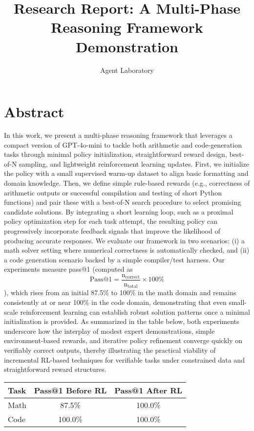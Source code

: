 \documentclass{article}
\title{Research Report: A Multi-Phase Reasoning Framework Demonstration}
\author{Agent Laboratory}
\begin{document}
\maketitle

\section{Abstract}
In this work, we present a multi-phase reasoning framework that leverages a compact version of GPT-4o-mini to tackle both arithmetic and code-generation tasks through minimal policy initialization, straightforward reward design, best-of-N sampling, and lightweight reinforcement learning updates. First, we initialize the policy with a small supervised warm-up dataset to align basic formatting and domain knowledge. Then, we define simple rule-based rewards (e.g., correctness of arithmetic outputs or successful compilation and testing of short Python functions) and pair these with a best-of-N search procedure to select promising candidate solutions. By integrating a short learning loop, such as a proximal policy optimization step for each task attempt, the resulting policy can progressively incorporate feedback signals that improve the likelihood of producing accurate responses. We evaluate our framework in two scenarios: (i) a math solver setting where numerical correctness is automatically checked, and (ii) a code generation scenario backed by a simple compiler/test harness. Our experiments measure pass@1 (computed as 
\[
 \mathrm{Pass@1} = \frac{\mathrm{n_{correct}}}{\mathrm{n_{total}}} \times 100\%
\]
), which rises from an initial 87.5\% to 100\% in the math domain and remains consistently at or near 100\% in the code domain, demonstrating that even small-scale reinforcement learning can establish robust solution patterns once a minimal initialization is provided. As summarized in the table below, both experiments underscore how the interplay of modest expert demonstrations, simple environment-based rewards, and iterative policy refinement converge quickly on verifiably correct outputs, thereby illustrating the practical viability of incremental RL-based techniques for verifiable tasks under constrained data and straightforward reward structures.

\begin{table}[h]
\centering
\begin{tabular}{lcc}
\hline
\textbf{Task} & \textbf{Pass@1 Before RL} & \textbf{Pass@1 After RL} \\
\hline
Math & 87.5\% & 100.0\% \\
Code & 100.0\% & 100.0\% \\
\hline
\end{tabular}
\end{table}
\end{document}

